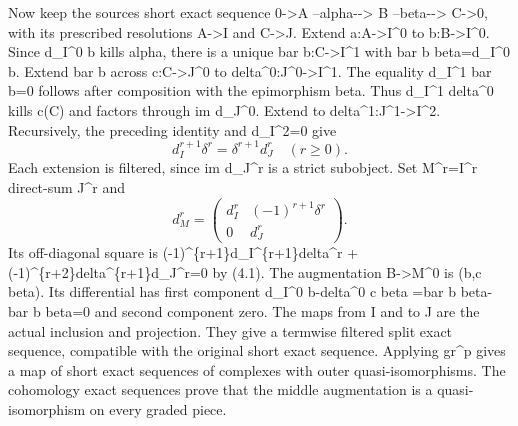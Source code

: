 \documentclass[11pt]{article}
\begin{document}
Now keep the source\textquotesingle s short exact sequence 0\allowbreak{}->A --alpha-\allowbreak{}-> B --beta-\allowbreak{}-> C\allowbreak{}->0,\allowbreak{} with its prescribed resolutions A\allowbreak{}->I and C\allowbreak{}->J. Extend a:\allowbreak{}A\allowbreak{}->I\textasciicircum{}0 to b:\allowbreak{}B\allowbreak{}->I\textasciicircum{}0. Since d\_\allowbreak{}I\textasciicircum{}0 b kills alpha,\allowbreak{} there is a unique bar b:\allowbreak{}C\allowbreak{}->I\textasciicircum{}1 with bar b beta\allowbreak{}=d\_\allowbreak{}I\textasciicircum{}0 b. Extend bar b across c:\allowbreak{}C\allowbreak{}->J\textasciicircum{}0 to delta\textasciicircum{}0:\allowbreak{}J\textasciicircum{}0\allowbreak{}->I\textasciicircum{}1. The equality d\_\allowbreak{}I\textasciicircum{}1 bar b\allowbreak{}=0 follows after composition with the epimorphism beta. Thus d\_\allowbreak{}I\textasciicircum{}1 delta\^{}0 kills c(C)\allowbreak{} and factors through im d\_\allowbreak{}J\textasciicircum{}0. Extend to delta\textasciicircum{}1:\allowbreak{}J\textasciicircum{}1\allowbreak{}->I\textasciicircum{}2. Recursively,\allowbreak{} the preceding identity and d\_\allowbreak{}I\textasciicircum{}2\allowbreak{}=0 give \[
 d_I^{r+1}\delta^r=\delta^{r+1}d_J^r
 \quad(r\ge0).                                               \tag{4.1}
\] Each extension is filtered,\allowbreak{} since im d\_\allowbreak{}J\textasciicircum{}r is a strict subobject. Set M\textasciicircum{}r\allowbreak{}=I\textasciicircum{}r direct-sum J\^{}r and \[
 d_M^r=
 \begin{pmatrix}
 d_I^r&(-1)^{r+1}\delta^r\\
 0&d_J^r
 \end{pmatrix}.                                              \tag{4.2}
\] Its off-diagonal square is (-1)\allowbreak{}\textasciicircum{}\{r\allowbreak{}+1\}d\_\allowbreak{}I\textasciicircum{}\{r\allowbreak{}+1\}delta\textasciicircum{}r \allowbreak{}+(-1)\allowbreak{}\textasciicircum{}\{r\allowbreak{}+2\}delta\textasciicircum{}\{r\allowbreak{}+1\}d\_\allowbreak{}J\textasciicircum{}r\allowbreak{}=0 by (4.1)\allowbreak{}. The augmentation B\allowbreak{}->M\textasciicircum{}0 is (b,\allowbreak{}c beta)\allowbreak{}. Its differential has first component d\_\allowbreak{}I\textasciicircum{}0 b-delta\^{}0 c beta \allowbreak{}=bar b beta-bar b beta\allowbreak{}=0 and second component zero. The maps from I and to J are the actual inclusion and projection. They give a termwise filtered split exact sequence,\allowbreak{} compatible with the original short exact sequence. Applying gr\^{}p gives a map of short exact sequences of complexes with outer quasi-isomorphisms. The cohomology exact sequences prove that the middle augmentation is a quasi-isomorphism on every graded piece.
\end{document}
